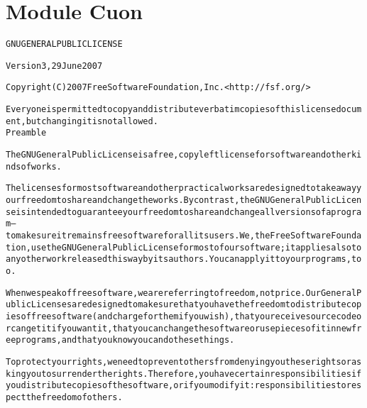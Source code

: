 %
%
%


\section{Module Cuon}

    \label{Cuon}
\begin{alltt}

GNU GENERAL PUBLIC LICENSE

Version 3, 29 June 2007

Copyright (C) 2007 Free Software Foundation, Inc. {\textless}http://fsf.org/{\textgreater}

Everyone is permitted to copy and distribute verbatim copies of this license document, but changing it is not allowed.
Preamble

The GNU General Public License is a free, copyleft license for software and other kinds of works.

The licenses for most software and other practical works are designed to take away your freedom to share and change the works. By contrast, the GNU General Public License is intended to guarantee your freedom to share and change all versions of a program--to make sure it remains free software for all its users. We, the Free Software Foundation, use the GNU General Public License for most of our software; it applies also to any other work released this way by its authors. You can apply it to your programs, too.

When we speak of free software, we are referring to freedom, not price. Our General Public Licenses are designed to make sure that you have the freedom to distribute copies of free software (and charge for them if you wish), that you receive source code or can get it if you want it, that you can change the software or use pieces of it in new free programs, and that you know you can do these things.

To protect your rights, we need to prevent others from denying you these rights or asking you to surrender the rights. Therefore, you have certain responsibilities if you distribute copies of the software, or if you modify it: responsibilities to respect the freedom of others.


\end{alltt}
